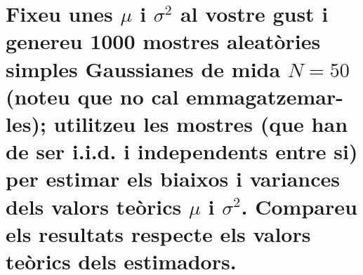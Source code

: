 \documentclass[a4paper,10pt]{article}
\begin{document}
\section{Fixeu unes $\mu$ i $\sigma^2$ al vostre gust i genereu 1000 mostres aleatòries simples Gaussianes de mida $N = 50$ (noteu que no cal emmagatzemar-les); utilitzeu les mostres (que han de ser i.i.d. i
independents entre si) per estimar els biaixos i variances dels valors teòrics
$\mu$ i $\sigma^2$. Compareu els
resultats respecte els valors teòrics dels estimadors.
}
\end{document}
